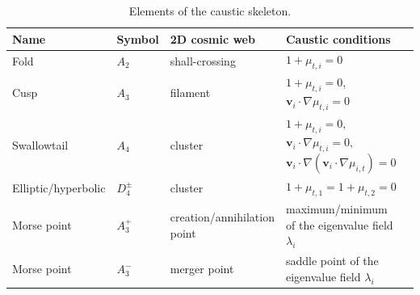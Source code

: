 \documentclass[a4paper, 11pt]{article}
\begin{document}
\begin{table}
\centering
{\scriptsize
\begin{tabular}{ |l | l | l | l | l|}
\hline
Name & Symbol & 2D cosmic web & Caustic conditions\\
\hline
Fold & $A_2$ & shall-crossing & $1+ \mu_{t,i} = 0$ \\
\hline
Cusp & $A_3$ & filament & $1+ \mu_{t,i} = 0$, $\bm{v}_i \cdot \nabla \mu_{t,i} = 0$\\
\hline
Swallowtail &$A_4$ &  cluster & $1+ \mu_{t,i} = 0$, $\bm{v}_i \cdot \nabla \mu_{t,i} = 0,$ $\bm{v}_i \cdot \nabla(\bm{v}_i \cdot \nabla \mu_{i,t}) = 0$\\
\hline
Elliptic/hyperbolic & $D_4^{\pm}$ & cluster & $1+ \mu_{t,1} = 1+ \mu_{t,2} = 0$\\
\hline
Morse point & $A_3^+$ & creation/annihilation point& maximum/minimum of the eigenvalue field $\lambda_i$\\
\hline
Morse point & $A_3^-$ & merger point & saddle point of the eigenvalue field $\lambda_i$\\
\hline
\end{tabular}
}
\caption{Elements of the caustic skeleton.}
\label{table:caustics}
\end{table}
\end{document}
